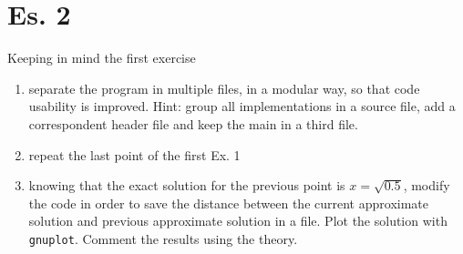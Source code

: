 \section*{Es. 2}

Keeping in mind the first exercise

\begin{enumerate}

    \item separate the program in multiple files, in a modular way, so that
    code usability is improved. Hint: group all implementations in a source
    file, add a correspondent header file and keep the main in a third file.

    \item repeat the last point of the first Ex. 1

    \item knowing that the exact solution for the previous point is
    $x=\sqrt{0.5}$, modify the code in order to save the distance between the
    current approximate solution and previous approximate solution in a file.
    Plot the solution with \texttt{gnuplot}. Comment the results using the
    theory.

\end{enumerate}
